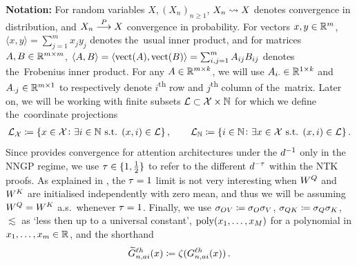 \textbf{Notation:} For random variables $X, (X_n)_{n \geq 1}$, $X_n \rightsquigarrow X$ denotes convergence in distribution, and $X_n \overset{P}{\longrightarrow} X$ convergence in probability. 
For vectors $x, y \in \mathbb{R}^{m}$, $\langle x, y \rangle = \sum_{j=1}^m x_j y_j$ denotes the~usual inner product, and for matrices $A, B \in \mathbb{R}^{m \times m}$, $\langle A , B \rangle = \langle \operatorname{vect}(A) , \operatorname{vect}(B) \rangle = \sum_{i, j = 1}^{m} A_{i j} B_{i j}$ denotes the~Frobenius inner product.
For any $A \in \mathbb{R}^{m \times k}$, we will use $A_{i \cdot} \in \mathbb{R}^{1 \times k}$ and $A_{\cdot j} \in \mathbb{R}^{m \times 1}$ to respectively denote $i$\textsuperscript{th} row and $j$\textsuperscript{th} column of the~matrix.
Later on, we will be working with finite subsets $\mathcal{L} \subset \mathcal{X} \times \mathbb{N}$ for which we define the~coordinate projections
\begin{align*}
    \mathcal{L}_{\mathcal{X}} 
    \coloneqq 
    \{ x \in \mathcal{X} \colon \exists i \in \mathbb{N} \text{ s.t. } (x,  i) \in \mathcal{L} \}
    \, , \qquad
    \mathcal{L}_{\mathbb{N}} 
    \coloneqq 
    \{ i \in \mathbb{N} \colon \exists x \in \mathcal{X} \text{ s.t. } (x,  i) \in \mathcal{L} \}
    \, .
\end{align*}
Since \citet{yang2019v2} provides convergence for attention architectures under the $d^{-1}$ only in the NNGP regime, we use $\tau \in \{ 1, \frac{1}{2} \}$ to refer to the different $d^{-\tau}$ within the NTK proofs.
As explained in , the $\tau = 1$ limit is not very interesting when $W^{Q}$ and $W^{K}$ are initialised independently with zero mean, and thus we will be assuming $W^{Q} = W^{K}$ a.s.\ whenever $\tau = 1$. 
Finally, we use $\sigma_{O V} \coloneqq \sigma_{O} \sigma_{V}$, $\sigma_{Q K} \coloneqq \sigma_{Q} \sigma_{K}$, $\lesssim$ as `less then up to a universal constant', $\operatorname{poly}(x_1, \ldots , x_M)$ for a polynomial in $x_1, \ldots, x_m \in \mathbb{R}^{}$, and the shorthand
\begin{align}
    \widetilde{G}_{n, a i}^{\ell h} (x)
    \coloneqq
    \zeta(G_{n, a i}^{\ell h}(x))
    \, .
\end{align}



